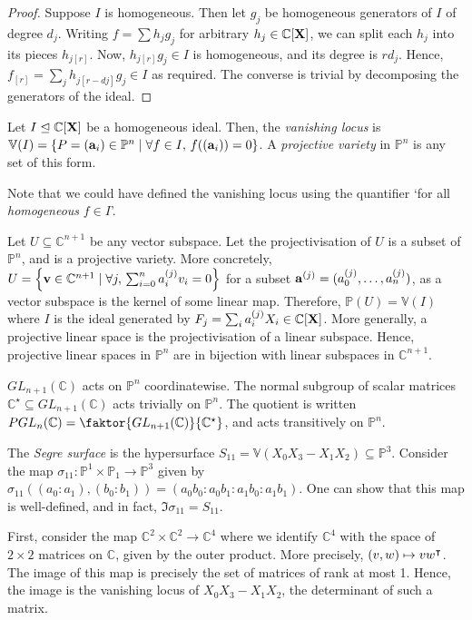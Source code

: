 \begin{proof}
    Suppose \( I \) is homogeneous.
    Then let \( g_j \) be homogeneous generators of \( I \) of degree \( d_j \).
    Writing \( f = \sum h_j g_j \) for arbitrary \( h_j \in \mathbb C[\vb X] \), we can split each \( h_j \) into its pieces \( h_{j[r]} \).
    Now, \( h_{j[r]} g_j \in I \) is homogeneous, and its degree is \( rd_j \).
    Hence, \( f_{[r]} = \sum_j h_{j[r-dj]} g_j \in I \) as required.
    The converse is trivial by decomposing the generators of the ideal.
\end{proof}
\begin{definition}
    Let \( I \trianglelefteq \mathbb C[\vb X] \) be a homogeneous ideal.
    Then, the \emph{vanishing locus} is \( \mathbb V(I) = \qty{P = (\vb a_i) \in \mathbb P^n \mid \forall f \in I,\, f((\vb a_i)) = 0} \).
    A \emph{projective variety} in \( \mathbb P^n \) is any set of this form.
\end{definition}
Note that we could have defined the vanishing locus using the quantifier `for all \emph{homogeneous} \( f \in I \)'.
\begin{example}
    Let \( U \subseteq \mathbb C^{n+1} \) be any vector subspace.
    Let the projectivisation of \( U \) is a subset of \( \mathbb P^n \), and is a projective variety.
    More concretely, \( U = \qty{\vb v \in \mathbb C^{n+1} \mid \forall j,\, \sum_{i=0}^n a_i^{(j)} v_i = 0} \) for a subset \( \vb a^{(j)} = (a_0^{(j)}, \dots, a_n^{(j)}) \), as a vector subspace is the kernel of some linear map.
    Therefore, \( \mathbb P(U) = \mathbb V(I) \) where \( I \) is the ideal generated by \( F_j = \sum_i a^{(j)}_i X_i \in \mathbb C[\vb X] \).
    More generally, a projective linear space is the projectivisation of a linear subspace.
    Hence, projective linear spaces in \( \mathbb P^n \) are in bijection with linear subspaces in \( \mathbb C^{n+1} \).
\end{example}
\( GL_{n+1}(\mathbb C) \) acts on \( \mathbb P^n \) coordinatewise.
The normal subgroup of scalar matrices \( \mathbb C^\star \subseteq GL_{n+1}(\mathbb C) \) acts trivially on \( \mathbb P^n \).
The quotient is written \( PGL_n(\mathbb C) = \faktor{GL_{n+1}(\mathbb C)}{\mathbb C^\star} \), and acts transitively on \( \mathbb P^n \).
\begin{example}
    The \emph{Segre surface} is the hypersurface \( S_{11} = \mathbb V(X_0X_3 - X_1X_2) \subseteq \mathbb P^3 \).
    Consider the map \( \sigma_{11} \colon \mathbb P^1 \times \mathbb P_1 \to \mathbb P^3 \) given by \( \sigma_{11}((a_0 : a_1), (b_0 : b_1)) = (a_0 b_0 : a_0 b_1 : a_1 b_0 : a_1 b_1) \).
    One can show that this map is well-defined, and in fact, \( \Im \sigma_{11} = S_{11} \).

    First, consider the map \( \mathbb C^2 \times \mathbb C^2 \to \mathbb C^4 \) where we identify \( \mathbb C^4 \) with the space of \( 2 \times 2 \) matrices on \( \mathbb C \), given by the outer product.
    More precisely, \( (v,w) \mapsto vw^\intercal \).
    The image of this map is precisely the set of matrices of rank at most 1.
    Hence, the image is the vanishing locus of \( X_0 X_3 - X_1 X_2 \), the determinant of such a matrix.
\end{example}

